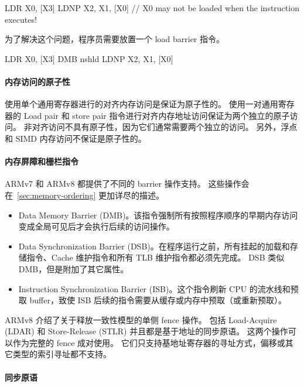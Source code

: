 \begin{lstcode}
  LDR X0, [X3]
  LDNP X2, X1, [X0] // X0 may not be loaded when the instruction executes!
\end{lstcode}

为了解决这个问题，程序员需要放置一个 load barrier 指令。

\begin{lstcode}
  LDR X0, [X3]
  DMB nshld
  LDNP X2, X1, [X0]
\end{lstcode}

\paragraph{内存访问的原子性}

使用单个通用寄存器进行的对齐内存访问是保证为原子性的。
使用一对通用寄存器的 Load pair 和 store pair 指令进行对齐内存地址访问保证为两个独立的原子访问。
非对齐访问不具有原子性，因为它们通常需要两个独立的访问。
另外，浮点和 SIMD 内存访问不保证是原子性的。

\paragraph{内存屏障和栅栏指令}

ARMv7 和 ARMv8 都提供了不同的 barrier 操作支持。
这些操作会在~\ref{sec:memory-ordering} 更加详尽的描述。

\begin{itemize}
  \item Data Memory Barrier (DMB)。该指令强制所有按照程序顺序的早期内存访问变成全局可见后才会执行后续的访问操作。
  \item Data Synchronization Barrier (DSB)。在程序运行之前，所有挂起的加载和存储指令、Cache 维护指令和所有 TLB 维护指令都必须先完成。
    DSB 类似 DMB，但是附加了其它属性。
  \item Instruction Synchronization Barrier (ISB)。这个指令刷新 CPU 的流水线和预取 buffer，致使 ISB 后续的指令需要从缓存或内存中预取（或重新预取）。
\end{itemize}

ARMv8 介绍了关于释放一致性模型的单侧 fence 操作。
包括 Load-Acquire (LDAR) 和 Store-Release (STLR) 并且都是基于地址的同步原语。
这两个操作可以作为完整的 fence 成对使用。
它们只支持基地址寄存器的寻址方式，偏移或其它类型的索引寻址都不支持。

\paragraph{同步原语}


